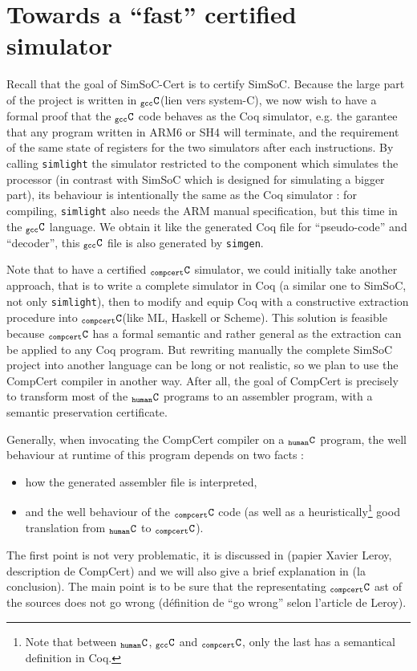 \documentclass[a4paper, 11pt]{article}
\newcommand{\simlight}{{\tt simlight}\xspace}
\newcommand{\simgen}{{\tt simgen}\xspace}
\newcommand{\C}{$_{\tt compcert}{\tt C}$\xspace}
\newcommand{\gccC}{$_{\tt gcc}{\tt C}$\xspace}
\newcommand{\hC}{$_{\tt human}{\tt C}$\xspace}
\begin{document}
\section{Towards a ``fast'' certified simulator}
Recall that the goal of SimSoC-Cert is to certify SimSoC. Because the large part of the project is written in \gccC (lien vers system-C), we now wish to have a formal proof that the \gccC code behaves as the Coq simulator, e.g. the garantee that any program written in ARM6 or SH4 will terminate, and the requirement of the same state of registers for the two simulators after each instructions. By calling \simlight the simulator restricted to the component which simulates the processor (in contrast with SimSoC which is designed for simulating a bigger part), its behaviour is intentionally the same as the Coq simulator : for compiling, \simlight also needs the ARM manual specification, but this time in the \gccC language. We obtain it like the generated Coq file for ``pseudo-code'' and ``decoder'', this \gccC file is also generated by \simgen.

Note that to have a certified \C simulator, we could initially take another approach, that is to write a complete simulator in Coq (a similar one to SimSoC, not only \simlight), then to modify and equip Coq with a constructive extraction procedure into \C (like ML, Haskell or Scheme). This solution is feasible because \C has a formal semantic and rather general as the extraction can be applied to any Coq program. But rewriting manually the complete SimSoC project into another language can be long or not realistic, so we plan to use the CompCert compiler in another way. After all, the goal of CompCert is precisely to transform most of the \hC programs to an assembler program, with a semantic preservation certificate. 

Generally, when invocating the CompCert compiler on a \hC program, the well behaviour at runtime of this program depends on two facts :
\begin{itemize}
\item how the generated assembler file is interpreted,
\item and the well behaviour of the \C code (as well as a heuristically\footnote{Note that between \hC, \gccC and \C, only the last has a semantical definition in Coq.} good translation from \hC to \C).
\end{itemize}
The first point is not very problematic, it is discussed in (papier Xavier Leroy, description de CompCert) and we will also give a brief explanation in (la conclusion).
The main point is to be sure that the representating \C ast of the sources does not go wrong (définition de ``go wrong'' selon l'article de Leroy).
\end{document}

